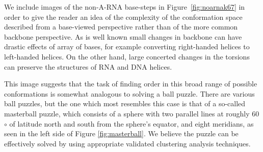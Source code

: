 We    include    images     of    the    non-A-RNA    base-steps    in
Figure~\ref{fig:noarnak67} in order to give  the reader an idea of the
complexity  of the  conformation  space described  from a  base-viewed
perspective rather  than of the more common  backbone perspective.  As
is well  known small changes in  backbone can have  drastic effects of
array  of  bases,  for  example  converting  right-handed  helices  to
left-handed   helices\cite{olson1976}.  On   the  other   hand,  large
concerted changes in  the torsions can preserve the  structures of RNA
and DNA helices.

This image suggests that the task of finding order in this broad range
of  possible conformations  is somewhat  analogous to  solving  a ball
puzzle.   There are  various  ball  puzzles, but  the  one which  most
resembles this  case is that  of a so-called masterball  puzzle, which
consists of a  sphere with two parallel lines  at roughly 60$\circ$ of
latitude  north  and  south  from  the  sphere's  equator,  and  eight
meridians, as seen in the left side of Figure \ref{fig:masterball}. We
believe  the puzzle  can be  effectively solved  by  using appropriate
validated clustering analysis techniques.


